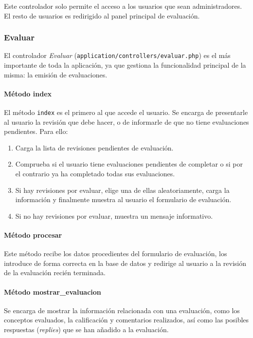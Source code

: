\documentclass[11pt]{article}
\begin{document}
Este controlador solo permite el acceso a los usuarios que sean
administradores. El resto de usuarios es redirigido al panel principal de
evaluación.

\subsubsection{Evaluar}

El controlador \textit{Evaluar} (\texttt{application/controllers/evaluar.php})
es el más importante de toda la aplicación, ya que gestiona la funcionalidad
principal de la misma: la emisión de evaluaciones.

\paragraph{Método index}

El método \texttt{index} es el primero al que accede el usuario. Se encarga de
presentarle al usuario la revisión que debe hacer, o de informarle de que no
tiene evaluaciones pendientes. Para ello:
\begin{enumerate}
\item Carga la lista de revisiones pendientes de evaluación.
\item Comprueba si el usuario tiene evaluaciones pendientes de completar o si
  por el contrario ya ha completado todas sus evaluaciones.
\item Si hay revisiones por evaluar, elige una de ellas aleatoriamente, carga la
  información y finalmente muestra al usuario el formulario de evaluación.
\item Si no hay revisiones por evaluar, muestra un mensaje informativo.
\end{enumerate}

\paragraph{Método procesar}

Este método recibe los datos procedientes del formulario de evaluación, los
introduce de forma correcta en la base de datos y redirige al usuario a la
revisión de la evaluación recién terminada.

\paragraph{Método mostrar\_evaluacion}

Se encarga de mostrar la información relacionada con una evaluación, como los
conceptos evaluados, la calificación y comentarios realizados, así como las
posibles respuestas (\textit{replies}) que se han añadido a la evaluación.
\end{document}
